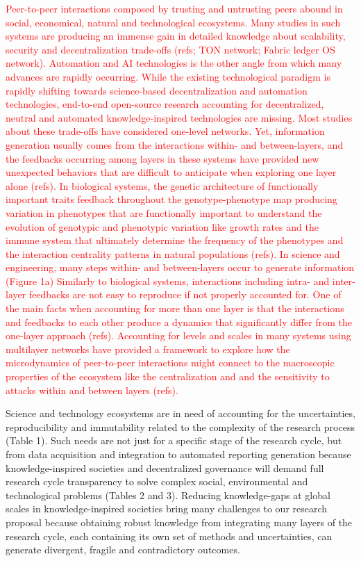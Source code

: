 \documentclass[12pt, a4paper]{article} %
\begin{document}
\textcolor{red}{Peer-to-peer interactions composed by trusting and
  untrusting peers abound in social, economical, natural and
  technological ecosystems. Many studies in such systems are producing
  an immense gain in detailed knowledge about scalability, security
  and decentralization trade-offs (refs; TON network; Fabric ledger OS
  network). Automation and AI technologies is the other angle from
  which many advances are rapidly occurring. While the existing
  technological paradigm is rapidly shifting towards science-based
  decentralization and automation technologies, end-to-end open-source
  research accounting for decentralized, neutral and automated
  knowledge-inspired technologies are missing. Most studies about
  these trade-offs have considered one-level networks. Yet,
  information generation usually comes from the interactions within-
  and between-layers, and the feedbacks occurring among layers in
  these systems have provided new unexpected behaviors that are
  difficult to anticipate when exploring one layer alone (refs). In
  biological systems, the genetic architecture of functionally
  important traits feedback throughout the genotype-phenotype map
  producing variation in phenotypes that are functionally important to
  understand the evolution of genotypic and phenotypic variation like
  growth rates and the immune system that ultimately determine the
  frequency of the phenotypes and the interaction centrality patterns
  in natural populations (refs). In science and engineering, many
  steps within- and between-layers occur to generate information
  (Figure 1a) Similarly to biological systems, interactions including
  intra- and inter-layer feedbacks are not easy to reproduce if not
  properly accounted for. One of the main facts when accounting for
  more than one layer is that the interactions and feedbacks to each
  other produce a dynamics that significantly differ from the
  one-layer approach (refs). Accounting for levels and scales in many
  systems using multilayer networks have provided a framework to
  explore how the microdynamics of peer-to-peer interactions might
  connect to the macroscopic properties of the ecosystem like the
  centralization and and the sensitivity to attacks within and between
  layers (refs).}

Science and technology ecosystems are in need of accounting for the
uncertainties, reproducibility and immutability related to the
complexity of the research process (Table 1). Such needs are not just
for a specific stage of the research cycle, but from data acquisition
and integration to automated reporting generation because
knowledge-inspired societies and decentralized governance will demand
full research cycle transparency to solve complex social,
environmental and technological problems (Tables 2 and 3). Reducing
knowledge-gaps at global scales in knowledge-inspired societies bring
many challenges to our research proposal because obtaining robust
knowledge from integrating many layers of the research cycle, each
containing its own set of methods and uncertainties, can generate
divergent, fragile and contradictory outcomes.
\end{document}
